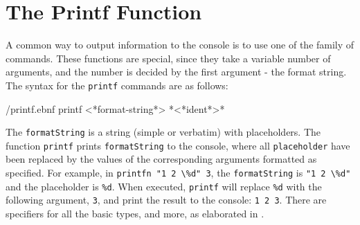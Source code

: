 \documentclass[fsharpnotes.tex]{subfiles}
\begin{document}
\section{The Printf Function}
\label{sec:printf}
A common way to output information to the console is to use one of the family of  commands. These functions are special, since they take a variable number of arguments, and the number is decided by the first argument - the format string. The syntax for the \lstinline{printf} commands are as follows:
%
\begin{verbatimwrite}{\ebnf/printf.ebnf}
printf <*format-string*> {*<*ident*>*}
\end{verbatimwrite}
%
The \lstinline[language=ebnf]!formatString! is a string (simple or verbatim) with placeholders. The function \lstinline[language=ebnf]!printf! prints \lstinline[language=ebnf]!formatString! to the console, where all \lstinline[language=ebnf]!placeholder! have been replaced by the values of the corresponding arguments formatted as specified. For example, in \mbox{\lstinline!printfn "1 2 \%d" 3!}, the \lstinline[language=ebnf]!formatString! is \mbox{\lstinline!"1 2 \%d"!} and the placeholder is \lstinline!%d!. %
When executed, \lstinline{printf} will replace \lstinline!%d! %
with the following argument, \lstinline{3}, and print the result to the console: \mbox{\lstinline!1 2 3!}.  There are specifiers for all the basic types, and more, as elaborated in .
% 
\end{document}
